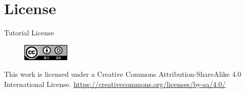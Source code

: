 \documentclass{beamer}
\begin{document}

\section{License}

\begin{frame}{Tutorial License}
  \begin{figure}[!t]
    \includegraphics[width=0.2\textwidth]{../images/cc-by-sa.png}
  \end{figure}
  \centering
  This work is licensed under a Creative Commons Attribution-ShareAlike 4.0 International License.
  \url{https://creativecommons.org/licenses/by-sa/4.0/}
\end{frame}
\end{document}
